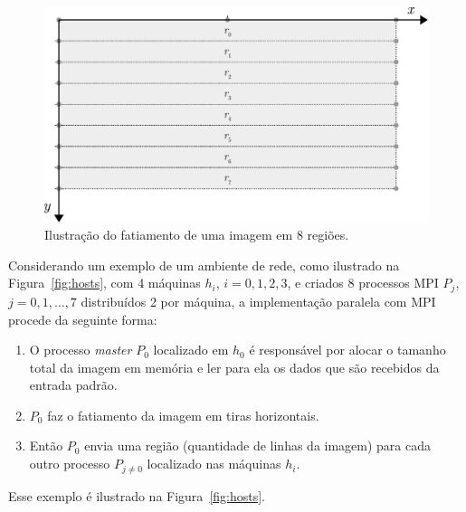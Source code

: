 \begin{figure}[h]
	\centering
	\includegraphics[scale=0.85]{./input/slice.pdf}
	\caption{Ilustração do fatiamento de uma imagem em 8 regiões. \label{fig:slice}}
\end{figure}

Considerando um exemplo de um ambiente de rede, como ilustrado na Figura~\ref{fig:hosts}, com 4 máquinas $h_i$, $i = 0, 1, 2, 3$, e criados 8 processos MPI $P_j$, $j = 0, 1, \dots, 7$ distribuídos 2 por máquina, a implementação paralela com MPI procede da seguinte forma:

\begin{enumerate}

	\item O processo \textit{master} $P_0$ localizado em $h_0$ é responsável por alocar o tamanho total da imagem em memória e ler para ela os dados que são recebidos da entrada padrão.
	
	\item $P_0$ faz o fatiamento da imagem em tiras horizontais.
	
	\item Então $P_0$ envia uma região (quantidade de linhas da imagem) para cada outro processo $P_{j \neq 0}$ localizado nas máquinas $h_i$.

\end{enumerate}


Esse exemplo é ilustrado na Figura~\ref{fig:hosts}.

